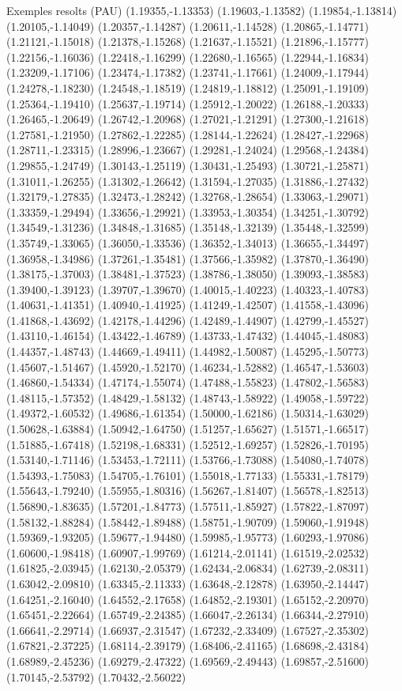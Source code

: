 \documentclass[11pt,a4paper]{article}
\begin{document}
\begin{fmex}{Exemples resolts (PAU)}
(1.19355,-1.13353) (1.19603,-1.13582) (1.19854,-1.13814) (1.20105,-1.14049) (1.20357,-1.14287) (1.20611,-1.14528) (1.20865,-1.14771) (1.21121,-1.15018) (1.21378,-1.15268) (1.21637,-1.15521) (1.21896,-1.15777) (1.22156,-1.16036) (1.22418,-1.16299) (1.22680,-1.16565) (1.22944,-1.16834) (1.23209,-1.17106) (1.23474,-1.17382) (1.23741,-1.17661) (1.24009,-1.17944) (1.24278,-1.18230) (1.24548,-1.18519) (1.24819,-1.18812) (1.25091,-1.19109) (1.25364,-1.19410) (1.25637,-1.19714) (1.25912,-1.20022) (1.26188,-1.20333) (1.26465,-1.20649) (1.26742,-1.20968) (1.27021,-1.21291) (1.27300,-1.21618) (1.27581,-1.21950) (1.27862,-1.22285) (1.28144,-1.22624) (1.28427,-1.22968) (1.28711,-1.23315) (1.28996,-1.23667) (1.29281,-1.24024) (1.29568,-1.24384) (1.29855,-1.24749) (1.30143,-1.25119) (1.30431,-1.25493) (1.30721,-1.25871) (1.31011,-1.26255) (1.31302,-1.26642) (1.31594,-1.27035) (1.31886,-1.27432) (1.32179,-1.27835) (1.32473,-1.28242) (1.32768,-1.28654) (1.33063,-1.29071) (1.33359,-1.29494) (1.33656,-1.29921) (1.33953,-1.30354) (1.34251,-1.30792) (1.34549,-1.31236) (1.34848,-1.31685) (1.35148,-1.32139) (1.35448,-1.32599) (1.35749,-1.33065) (1.36050,-1.33536) (1.36352,-1.34013) (1.36655,-1.34497) (1.36958,-1.34986) (1.37261,-1.35481) (1.37566,-1.35982) (1.37870,-1.36490) (1.38175,-1.37003) (1.38481,-1.37523) (1.38786,-1.38050) (1.39093,-1.38583) (1.39400,-1.39123) (1.39707,-1.39670) (1.40015,-1.40223) (1.40323,-1.40783) (1.40631,-1.41351) (1.40940,-1.41925) (1.41249,-1.42507) (1.41558,-1.43096) (1.41868,-1.43692) (1.42178,-1.44296) (1.42489,-1.44907) (1.42799,-1.45527) (1.43110,-1.46154) (1.43422,-1.46789) (1.43733,-1.47432) (1.44045,-1.48083) (1.44357,-1.48743) (1.44669,-1.49411) (1.44982,-1.50087) (1.45295,-1.50773) (1.45607,-1.51467) (1.45920,-1.52170) (1.46234,-1.52882) (1.46547,-1.53603) (1.46860,-1.54334) (1.47174,-1.55074) (1.47488,-1.55823) (1.47802,-1.56583) (1.48115,-1.57352) (1.48429,-1.58132) (1.48743,-1.58922) (1.49058,-1.59722) (1.49372,-1.60532) (1.49686,-1.61354) (1.50000,-1.62186) (1.50314,-1.63029) (1.50628,-1.63884) (1.50942,-1.64750) (1.51257,-1.65627) (1.51571,-1.66517) (1.51885,-1.67418) (1.52198,-1.68331) (1.52512,-1.69257) (1.52826,-1.70195) (1.53140,-1.71146) (1.53453,-1.72111) (1.53766,-1.73088) (1.54080,-1.74078) (1.54393,-1.75083) (1.54705,-1.76101) (1.55018,-1.77133) (1.55331,-1.78179) (1.55643,-1.79240) (1.55955,-1.80316) (1.56267,-1.81407) (1.56578,-1.82513) (1.56890,-1.83635) (1.57201,-1.84773) (1.57511,-1.85927) (1.57822,-1.87097) (1.58132,-1.88284) (1.58442,-1.89488) (1.58751,-1.90709) (1.59060,-1.91948) (1.59369,-1.93205) (1.59677,-1.94480) (1.59985,-1.95773) (1.60293,-1.97086) (1.60600,-1.98418) (1.60907,-1.99769) (1.61214,-2.01141) (1.61519,-2.02532) (1.61825,-2.03945) (1.62130,-2.05379) (1.62434,-2.06834) (1.62739,-2.08311) (1.63042,-2.09810) (1.63345,-2.11333) (1.63648,-2.12878) (1.63950,-2.14447) (1.64251,-2.16040) (1.64552,-2.17658) (1.64852,-2.19301) (1.65152,-2.20970) (1.65451,-2.22664) (1.65749,-2.24385) (1.66047,-2.26134) (1.66344,-2.27910) (1.66641,-2.29714) (1.66937,-2.31547) (1.67232,-2.33409) (1.67527,-2.35302) (1.67821,-2.37225) (1.68114,-2.39179) (1.68406,-2.41165) (1.68698,-2.43184) (1.68989,-2.45236) (1.69279,-2.47322) (1.69569,-2.49443) (1.69857,-2.51600) (1.70145,-2.53792) (1.70432,-2.56022) 
\end{fmex}
\end{document}
